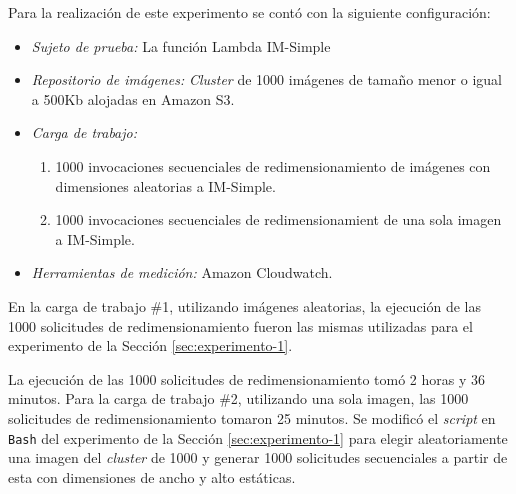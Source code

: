 Para la realización de este experimento se contó con la siguiente configuración:
\begin{itemize}
    \item \emph{Sujeto de prueba:} La función Lambda IM-Simple
    \item \emph{Repositorio de imágenes:} \emph{Cluster} de 1000 imágenes de tamaño menor o igual a 500Kb alojadas en Amazon S3.
    \item \emph{Carga de trabajo:} 
    \begin{enumerate}
        \item 1000 invocaciones secuenciales de redimensionamiento de imágenes con dimensiones aleatorias a IM-Simple.
        \item 1000 invocaciones secuenciales de redimensionamient de una sola imagen a IM-Simple.
    \end{enumerate}
    \item \emph{Herramientas de medición:} Amazon Cloudwatch.
\end{itemize}

En la carga de trabajo \#1, utilizando imágenes aleatorias, la ejecución de las 1000 solicitudes de redimensionamiento fueron las mismas utilizadas para el experimento de la Sección \ref{sec:experimento-1}. 

La ejecución de las 1000 solicitudes de redimensionamiento tomó 2 horas y 36 minutos. Para la carga de trabajo \#2, utilizando una sola imagen, las 1000 solicitudes de redimensionamiento tomaron 25 minutos. Se modificó el \emph{script} en \texttt{Bash} del experimento de la Sección \ref{sec:experimento-1} para elegir aleatoriamente una imagen del \emph{cluster} de 1000 y generar 1000 solicitudes secuenciales a partir de esta con dimensiones de ancho y alto estáticas.

